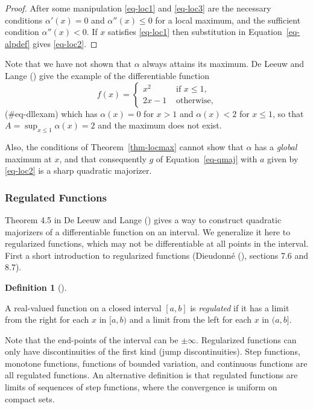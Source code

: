 \documentclass[
  12pt,
  letterpaper,
  DIV=11,
  numbers=noendperiod]{scrartcl}
\theoremstyle{definition}
\newtheorem{definition}{Definition}[section]
\theoremstyle{plain}
\theoremstyle{plain}
\theoremstyle{remark}
\begin{document}
\begin{proof}
After some manipulation \eqref{eq-loc1} and \eqref{eq-loc3} are the
necessary conditions \(\alpha'(x)=0\) and \(\alpha''(x)\leq 0\) for a
local maximum, and the sufficient condition \(\alpha''(x)<0\). If \(x\)
satisfies \eqref{eq-loc1} then substitution in Equation~\ref{eq-alpdef}
gives \eqref{eq-loc2}.
\end{proof}

Note that we have not shown that \(\alpha\) always attains its maximum.
De Leeuw and Lange () give the
example of the differentiable function \[
f(x)=\begin{cases}
x^2&\text{ if }x\leq 1,\\
2x-1&\text{ otherwise},
\end{cases}
\](\#eq-dllexam) which has \(\alpha(x)=0\) for \(x>1\) and
\(\alpha(x)<2\) for \(x\leq 1\), so that \(A=\sup_{x\leq 1}\alpha(x)=2\)
and the maximum does not exist.

Also, the conditions of Theorem~\ref{thm-locmax} cannot show that
\(\alpha\) has a \emph{global} maximum at \(x\), and that consequently
\(g\) of Equation~\ref{eq-qmaj} with \(a\) given by \eqref{eq-loc2} is a
sharp quadratic majorizer.

\subsubsection{Regulated Functions}\label{regulated-functions}

Theorem 4.5 in De Leeuw and Lange
() gives a way to construct
quadratic majorizers of a differentiable function on an interval. We
generalize it here to regularized functions, which may not be
differentiable at all points in the interval. First a short introduction
to regularized functions (Dieudonné (),
sections 7.6 and 8.7).

\begin{definition}[]\protect\hypertarget{def-regulated}{}\label{def-regulated}

A real-valued function on a closed interval \([a,b]\) is
\emph{regulated} if it has a limit from the right for each \(x\) in
\([a,b)\) and a limit from the left for each \(x\) in \((a,b]\).

\end{definition}

Note that the end-points of the interval can be \(\pm\infty\).
Regularized functions can only have discontinuities of the first kind
(jump discontinuities). Step functions, monotone functions, functions of
bounded variation, and continuous functions are all regulated functions.
An alternative definition is that regulated functions are limits of
sequences of step functions, where the convergence is uniform on compact
sets.
\end{document}
